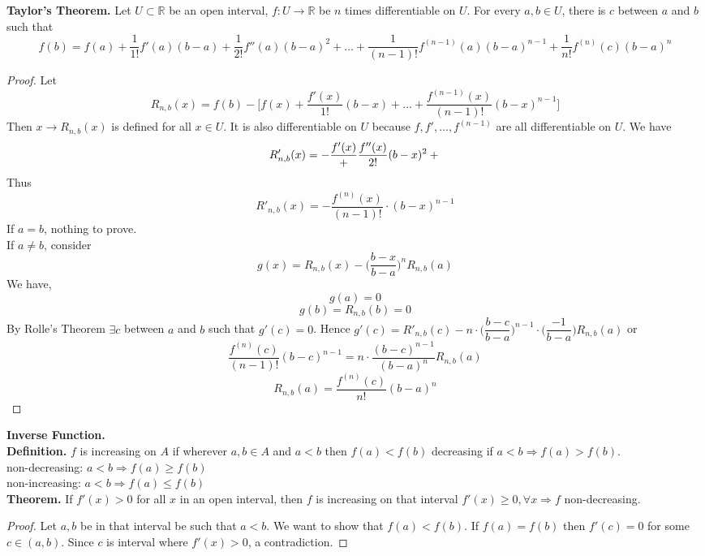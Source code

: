 \documentclass[10pt,letterpaper]{article}
\begin{document}
	\textbf{Taylor's Theorem. } Let $U \subset \mathbb{R}$ be an open interval, $f:U \rightarrow \mathbb{R}$
	be $n$ times differentiable on $U$. For every $a, b \in U$, there is $c$ between $a$ and $b$ such that
	$$f(b) = f(a) + \dfrac{1}{1!}f'(a)(b - a) + \dfrac{1}{2!}f''(a)(b - a)^2 + \ldots + 
	\dfrac{1}{(n - 1)!}f^{(n-1)}(a)(b - a)^{n-1} + \dfrac{1}{n!}f^{(n)}(c)(b - a)^n$$
	\begin{proof}
		Let $$R_{n,b}(x) = f(b) - \bigg[f(x) + \dfrac{f'(x)}{1!}(b - x) + \ldots + 
		\dfrac{f^{(n-1)}(x)}{(n - 1)!}(b - x)^{n-1} \bigg]$$
		Then $x \rightarrow R_{n,b}(x)$ is defined for all $x \in U$. It is also differentiable
		on $U$ because $f, f', \ldots, f^{(n-1)}$ are all differentiable on $U$.
		We have 
		$$R'_{n,b}(x) = 
		-\dfrac{f'(x)} + \\
		\dfrac{f''(x)}{2!}(b - x)^2 + \\
		$$
		Thus		
		$$R'_{n,b}(x) = -\dfrac{f^{(n)}(x)}{(n - 1)!} \cdot (b - x)^{n-1}$$
		If $a = b$, nothing to prove. \\
		If $a \neq b$, consider
		$$g(x) = R_{n,b}(x) - \bigg(\dfrac{b - x}{b - a}\bigg)^nR_{n,b}(a)$$
		We have,
		$$g(a) = 0$$
		$$g(b) = R_{n,b}(b) = 0$$
		By Rolle's Theorem $\exists c$ between $a$ and $b$ such that $g'(c) = 0$.
		Hence $g'(c) = R'_{n,b}(c) - n \cdot \bigg(\dfrac{b - c}{b - a}\bigg)^{n-1}
		\cdot \bigg(\dfrac{-1}{b - a}\bigg)R_{n,b}(a)$
		or
		$$\dfrac{f^{(n)}(c)}{(n - 1)!}(b - c)^{n-1} = n \cdot \dfrac{(b-c)^{n-1}}{(b - a)^n}R_{n,b}(a)$$
		$$R_{n,b}(a) = \dfrac{f^{(n)}(c)}{n!}(b - a)^{n}$$		
	\end{proof}

	\textbf{{\color{cyan}Inverse Function. }} \\
	\textbf{Definition. } $f$ is increasing on $A$ if wherever $a, b \in A$ and $a < b$ then $f(a) < f(b)$
	decreasing if $a < b \Rightarrow f(a) > f(b)$. \\
	non-decreasing: $a < b \Rightarrow f(a) \geq f(b)$ \\
	non-increasing: $a < b \Rightarrow f(a) \leq f(b)$ \\

	\textbf{Theorem. } If $f'(x) > 0$ for all $x$ in an open interval, then $f$ is increasing on that interval
	$f'(x) \geq 0, \forall x \Rightarrow f$ non-decreasing. 
	\begin{proof}
		Let $a, b$ be in that interval be such that $a < b$. We want to show that $f(a) < f(b)$. If 
		$f(a) = f(b)$ then $f'(c) = 0$ for some $c \in (a, b)$. Since $c$ is interval where
		$f'(x) > 0$, a contradiction.
	\end{proof}
\end{document}
